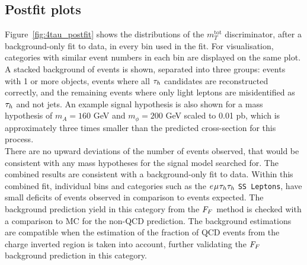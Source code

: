 \subsection{Postfit plots}

Figure~\ref{fig:4tau_postfit} shows the distributions of the $m_{T}^{\text{tot}}$ discriminator, after a background-only fit to data, in every bin used in the fit.
For visualisation, categories with similar event numbers in each bin are displayed on the same plot.
A stacked background of events is shown, separated into three groups: events with 1 or more \jtth objects, events where all $\tau_{h}$ candidates are reconstructed correctly, and the remaining events where only light leptons are misidentified as $\tau_{h}$ and not jets.
An example signal hypothesis is also shown for a mass hypothesis of $m_A = 160$ GeV and $m_{\phi} = 200$ GeV scaled to 0.01 pb, which is approximately three times smaller than the predicted cross-section for this process. \\

There are no upward deviations of the number of events observed, that would be consistent with any mass hypotheses for the signal model searched for.
The combined results are consistent with a background-only fit to data.
Within this combined fit, individual bins and categories such as the $e_{}\mu_{}\tau_{h}\tau_{h}$ \texttt{SS Leptons}, have small deficits of events observed in comparison to events expected.
The background prediction yield in this category from the $F_{F}$ method is checked with a comparison to \ac{MC} for the non-\ac{QCD} prediction.
The background estimations are compatible when the estimation of the fraction of \ac{QCD} events from the charge inverted region is taken into account, further validating the $F_{F}$ background prediction in this category.


